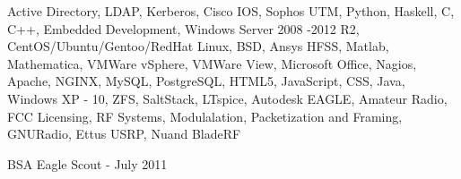 
\begin{cventries}
    \begin{cvitems}
    \item {Active Directory, LDAP, Kerberos, Cisco IOS, Sophos UTM, Python, Haskell, C, C++, Embedded Development, Windows Server 2008 -2012 R2, CentOS/Ubuntu/Gentoo/RedHat Linux, BSD, Ansys HFSS, Matlab, Mathematica, VMWare vSphere, VMWare View, Microsoft Office, Nagios, Apache, NGINX, MySQL, PostgreSQL, HTML5, JavaScript, CSS, Java, Windows XP - 10, ZFS, SaltStack, LTspice, Autodesk EAGLE, Amateur Radio, FCC Licensing, RF Systems, Modulalation, Packetization and Framing, GNURadio, Ettus USRP, Nuand BladeRF}
    \item {BSA Eagle Scout - July 2011}
    \end{cvitems}
\end{cventries}
